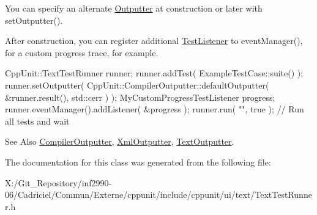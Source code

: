 You can specify an alternate \hyperlink{class_outputter}{Outputter} at construction or later with set\-Outputter().

After construction, you can register additional \hyperlink{class_test_listener}{Test\-Listener} to event\-Manager(), for a custom progress trace, for example.


\begin{DoxyCode}
CppUnit::TextTestRunner runner;
runner.addTest( ExampleTestCase::suite() );
runner.setOutputter( CppUnit::CompilerOutputter::defaultOutputter( 
                         &runner.result(),
                         std::cerr ) );
MyCustomProgressTestListener progress;
runner.eventManager().addListener( &progress );
runner.run( \textcolor{stringliteral}{""}, \textcolor{keyword}{true} );    \textcolor{comment}{// Run all tests and wait}
\end{DoxyCode}


\begin{DoxySeeAlso}{See Also}
\hyperlink{class_compiler_outputter}{Compiler\-Outputter}, \hyperlink{class_xml_outputter}{Xml\-Outputter}, \hyperlink{class_text_outputter}{Text\-Outputter}. 
\end{DoxySeeAlso}


The documentation for this class was generated from the following file\-:\begin{DoxyCompactItemize}
\item 
X\-:/\-Git\-\_\-\-Repository/inf2990-\/06/\-Cadriciel/\-Commun/\-Externe/cppunit/include/cppunit/ui/text/Text\-Test\-Runner.\-h\end{DoxyCompactItemize}
